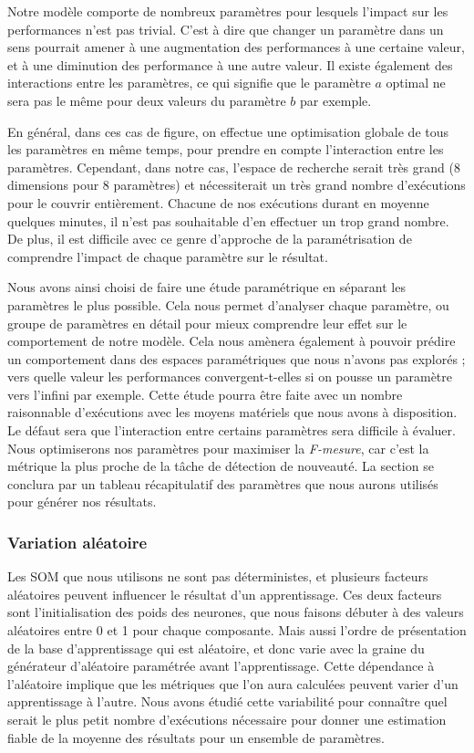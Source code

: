 	Notre modèle comporte de nombreux paramètres pour lesquels l'impact sur les performances n'est pas trivial. C'est à dire que changer un paramètre dans un sens pourrait amener à une augmentation des performances à une certaine valeur, et à une diminution des performance à une autre valeur. Il existe également des interactions entre les paramètres, ce qui signifie que le paramètre $a$ optimal ne sera pas le même pour deux valeurs du paramètre $b$ par exemple. 

	En général, dans ces cas de figure, on effectue une optimisation globale de tous les paramètres en même temps, pour prendre en compte l'interaction entre les paramètres. Cependant, dans notre cas, l'espace de recherche serait très grand (8 dimensions pour 8 paramètres) et nécessiterait un très grand nombre d'exécutions pour le couvrir entièrement. Chacune de nos exécutions durant en moyenne quelques minutes, il n'est pas souhaitable d'en effectuer un trop grand nombre. De plus, il est difficile avec ce genre d'approche de la paramétrisation de comprendre l'impact de chaque paramètre sur le résultat.

	Nous avons ainsi choisi de faire une étude paramétrique en séparant les paramètres le plus possible. Cela nous permet d'analyser chaque paramètre, ou groupe de paramètres en détail pour mieux comprendre leur effet sur le comportement de notre modèle. Cela nous amènera également à pouvoir prédire un comportement dans des espaces paramétriques que nous n'avons pas explorés ; vers quelle valeur les performances convergent-t-elles si on pousse un paramètre vers l'infini par exemple. Cette étude pourra être faite avec un nombre raisonnable d'exécutions avec les moyens matériels que nous avons à disposition. Le défaut sera que l'interaction entre certains paramètres sera difficile à évaluer. Nous optimiserons nos paramètres pour maximiser la \textit{F-mesure}, car c'est la métrique la plus proche de la tâche de détection de nouveauté. La section se conclura par un tableau récapitulatif des paramètres que nous aurons utilisés pour générer nos résultats.

	\subsubsection{Variation aléatoire}

	Les SOM que nous utilisons ne sont pas déterministes, et plusieurs facteurs aléatoires peuvent influencer le résultat d'un apprentissage. Ces deux facteurs sont l'initialisation des poids des neurones, que nous faisons débuter à des valeurs aléatoires entre 0 et 1 pour chaque composante. Mais aussi l'ordre de présentation de la base d'apprentissage qui est aléatoire, et donc varie avec la graine du générateur d'aléatoire paramétrée avant l'apprentissage. Cette dépendance à l'aléatoire implique que les métriques que l'on aura calculées peuvent varier d'un apprentissage à l'autre. Nous avons étudié cette variabilité pour connaître quel serait le plus petit nombre d'exécutions nécessaire pour donner une estimation fiable de la moyenne des résultats pour un ensemble de paramètres. 

